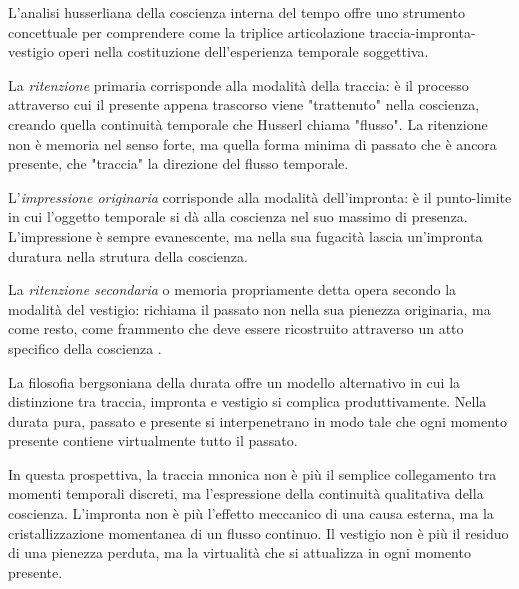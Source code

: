 L'analisi husserliana della coscienza interna del tempo \cite{husserl1928} offre uno strumento concettuale per comprendere come la triplice articolazione traccia-impronta-vestigio operi nella costituzione dell'esperienza temporale soggettiva.

La \textit{ritenzione} primaria corrisponde alla modalità della traccia: è il processo attraverso cui il presente appena trascorso viene "trattenuto" nella coscienza, creando quella continuità temporale che Husserl chiama "flusso". La ritenzione non è memoria nel senso forte, ma quella forma minima di passato che è ancora presente, che "traccia" la direzione del flusso temporale.

L'\textit{impressione originaria} corrisponde alla modalità dell'impronta: è il punto-limite in cui l'oggetto temporale si dà alla coscienza nel suo massimo di presenza. L'impressione è sempre evanescente, ma nella sua fugacità lascia un'impronta duratura nella strutura della coscienza.

La \textit{ritenzione secondaria} o memoria propriamente detta opera secondo la modalità del vestigio: richiama il passato non nella sua pienezza originaria, ma come resto, come frammento che deve essere ricostruito attraverso un atto specifico della coscienza \cite{husserl1913}.


La filosofia bergsoniana della durata \cite{bergson1896} offre un modello alternativo in cui la distinzione tra traccia, impronta e vestigio si complica produttivamente. Nella durata pura, passato e presente si interpenetrano in modo tale che ogni momento presente contiene virtualmente tutto il passato.

In questa prospettiva, la traccia mnonica non è più il semplice collegamento tra momenti temporali discreti, ma l'espressione della continuità qualitativa della coscienza. L'impronta non è più l'effetto meccanico di una causa esterna, ma la cristallizzazione momentanea di un flusso continuo. Il vestigio non è più il residuo di una pienezza perduta, ma la virtualità che si attualizza in ogni momento presente.

